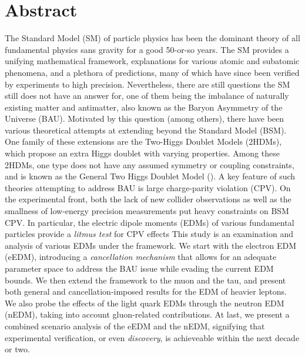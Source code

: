 \chapter{Abstract}
\label{ch:abstract}
The Standard Model (SM) of particle physics has been the dominant theory of all fundamental physics sans gravity for a good 50-or-so years.
The SM provides a unifying mathematical framework, explanations for various atomic and subatomic phenomena,
and a plethora of predictions, many of which have since been verified by experiments to high precision.
Nevertheless, there are still questions the SM still does not have an answer for, 
one of them being the imbalance of naturally existing matter and antimatter,
also known as the Baryon Asymmetry of the Universe (BAU).
Motivated by this question (among others), there have been various theoretical attempts at extending beyond the Standard Model (BSM).
One family of these extensions are the Two-Higgs Doublet Models (2HDMs), which propose an extra Higgs doublet with varying properties.
Among these 2HDMs, one type does not have any assumed symmetry or coupling constraints, and is known as the General Two Higgs Doublet Model ({\gthdm}).
A key feature of such theories attempting to address BAU is large charge-parity violation (CPV).
On the experimental front, both the lack of new collider observations as well as the smallness of low-energy precision measurements put heavy constraints on BSM CPV.
In particular, the electric dipole moments (EDMs) of various fundamental particles provide a \textit{litmus test} for CPV effects
This study is an examination and analysis of various EDMs under the {\gthdm} framework. 
We start with the electron EDM (eEDM), introducing a \textit{cancellation mechanism} that allows for an adequate parameter space to address the BAU issue while evading the current EDM bounds.
We then extend the framework to the muon and the tau, and present both general and cancellation-imposed results for the EDM of heavier leptons.
We also probe the effects of the light quark EDMs through the neutron EDM (nEDM), taking into account gluon-related contributions.
At last, we present a combined scenario analysis of the eEDM and the nEDM, signifying that experimental verification, or even \textit{discovery}, is achieveable within the next decade or two.